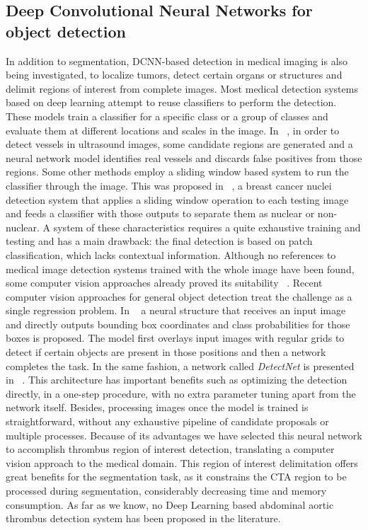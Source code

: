 \documentclass[preprint,authoryear,12pt]{elsarticle}
\begin{document}
\subsection{Deep Convolutional Neural Networks for object detection }
In addition to segmentation, DCNN-based detection in medical imaging is also being investigated, to localize tumors, detect certain organs or structures and delimit regions of interest from complete images. Most medical detection systems based on deep learning attempt to reuse classifiers to perform the detection. These models train a classifier for a specific class or a group of classes and evaluate them at different locations and scales in the image. In ~\citep{Smi1}, in order to detect vessels in ultrasound images, some candidate regions are generated and a neural network model identifies real vessels and discards false positives from those regions. Some other methods employ a sliding window based system to run the classifier through the image. This was proposed in ~\citep{Xu1}, a breast cancer nuclei detection system that applies a sliding window operation to each testing image and feeds a classifier with those outputs to separate them as nuclear or non-nuclear. A system of these characteristics requires a quite exhaustive training and testing and has a main drawback: the final detection is based on patch classification, which lacks contextual information. Although no references to medical image detection systems trained with the whole image have been found, some computer vision approaches already proved its suitability ~\citep{Bar1,Shin1}. Recent computer vision approaches for general object detection treat the challenge as a single regression problem. In ~\citep{Red1} a neural structure that receives an input image and directly outputs bounding box coordinates and class probabilities for those boxes is proposed. The model first overlays input images with regular grids to detect if certain objects are present in those positions and then a network completes the task. In the same fashion, a network called \textit{DetectNet} is presented in ~\citep{Detectnet}. This architecture has important benefits such as optimizing the detection directly, in a one-step procedure, with no extra parameter tuning apart from the network itself. Besides, processing images once the model is trained is straightforward, without any exhaustive pipeline of candidate proposals or multiple processes. Because of its advantages we have selected this neural network to accomplish thrombus region of interest detection, translating a computer vision approach to the medical domain. This region of interest delimitation offers great benefits for the segmentation task, as it constrains the CTA region to be processed during segmentation, considerably decreasing time and memory consumption. As far as we know, no Deep Learning based abdominal aortic thrombus detection system has been proposed in the literature.
\end{document}
